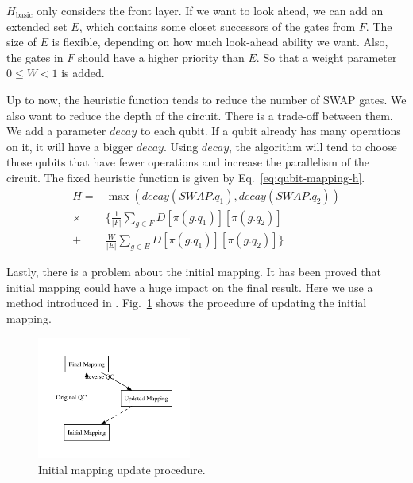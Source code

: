 $H_{\text{basic}}$ only considers the front layer. If we want to look ahead, we can add an extended set $E$, which contains some closet successors of the gates from $F$. The size of $E$ is flexible, depending on how much look-ahead ability we want. Also, the gates in $F$ should have a higher priority than $E$. So that a weight parameter $0 \leq W < 1$ is added.

Up to now, the heuristic function tends to reduce the number of SWAP gates. We also want to reduce the depth of the circuit. There is a trade-off between them. We add a parameter $decay$ to each qubit. If a qubit already has many operations on it, it will have a bigger $decay$. Using $decay$, the algorithm will tend to choose those qubits that have fewer operations and increase the parallelism of the circuit. The fixed heuristic function is given by 
Eq.~\eqref{eq:qubit-mapping-h}.
\begin{equation} \label{eq:qubit-mapping-h}
	\begin{aligned}
		H = & \max \left( decay(SWAP.q_1), decay(SWAP.q_2) \right)  \\
		\times & \Big\lbrace \frac{1}{|F|} \sum_{g \in F} D[\pi(g.q_1)][\pi(g.q_2)] \\
		+ & \frac{W}{|E|} \sum_{g \in E} D[\pi(g.q_1)][\pi(g.q_2)] \Big\rbrace
	\end{aligned}
\end{equation} 

Lastly, there is a problem about the initial mapping. It has been proved that initial mapping could have a huge impact on the final result. Here we use a method introduced in \cite{li2019tackling}. 
Fig.~\ref{fig:qubit-mapping-initial-mapping}
shows the procedure of updating the initial mapping.

\begin{figure}
	\centering
	\includegraphics[width=0.45\textwidth]{8.2_figures/initial_mapping.pdf}
	\caption{Initial mapping update procedure.}
	\label{fig:qubit-mapping-initial-mapping}
\end{figure}

